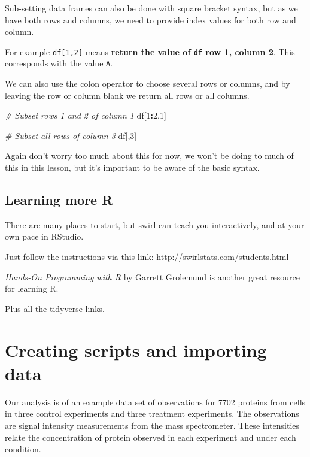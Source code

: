 \documentclass[12pt,]{book}
\newenvironment{Shaded}{\begin{snugshade}}{\end{snugshade}}
\newcommand{\DecValTok}[1]{\textcolor[rgb]{0.00,0.00,0.81}{#1}}
\newcommand{\CommentTok}[1]{\textcolor[rgb]{0.56,0.35,0.01}{\textit{#1}}}
\newcommand{\OperatorTok}[1]{\textcolor[rgb]{0.81,0.36,0.00}{\textbf{#1}}}
\newcommand{\NormalTok}[1]{#1}
\theoremstyle{definition}
\theoremstyle{definition}
\theoremstyle{definition}
\theoremstyle{remark}
\begin{document}
Sub-setting data frames can also be done with square bracket syntax, but
as we have both rows and columns, we need to provide index values for
both row and column.

For example \texttt{df{[}1,2{]}} means \textbf{return the value of
\texttt{df} row 1, column 2}. This corresponds with the value
\texttt{A}.

We can also use the colon operator to choose several rows or columns,
and by leaving the row or column blank we return all rows or all
columns.

\begin{Shaded}
\begin{Highlighting}[]
\CommentTok{# Subset rows 1 and 2 of column 1}
\NormalTok{df[}\DecValTok{1}\OperatorTok{:}\DecValTok{2}\NormalTok{,}\DecValTok{1}\NormalTok{]}

\CommentTok{# Subset all rows of column 3}
\NormalTok{df[,}\DecValTok{3}\NormalTok{]}
\end{Highlighting}
\end{Shaded}

Again don't worry too much about this for now, we won't be doing to much
of this in this lesson, but it's important to be aware of the basic
syntax.

\section{Learning more R}\label{learning-more-r}

There are many places to start, but swirl can teach you interactively,
and at your own pace in RStudio.

Just follow the instructions via this link:
\url{http://swirlstats.com/students.html}

\emph{Hands-On Programming with R} by Garrett Grolemund is another great
resource for learning R.

Plus all the \href{https://www.tidyverse.org/learn/}{tidyverse links}.

\chapter{Creating scripts and importing data}\label{import}

Our analysis is of an example data set of observations for 7702 proteins
from cells in three control experiments and three treatment experiments.
The observations are signal intensity measurements from the mass
spectrometer. These intensities relate the concentration of protein
observed in each experiment and under each condition.
\end{document}
